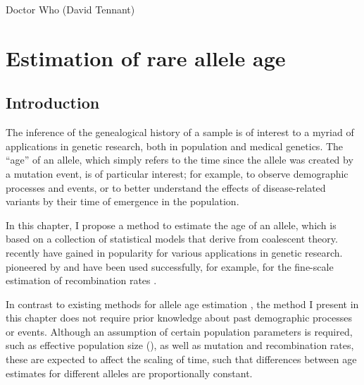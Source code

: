 
\glsresetall


{Doctor Who (David Tennant)}


{
\singlespacing
\chapter{Estimation of rare allele age}
\label{ch:rvage}
\minitoc
}


%
\section{Introduction}
%

The inference of the genealogical history of a sample is of interest to a myriad of applications in genetic research, both in population and medical genetics.
The ``age'' of an allele, which simply refers to the time since the allele was created by a mutation event, is of particular interest; for example, to observe demographic processes and events, or to better understand the effects of disease-related variants by their time of emergence in the population.

In this chapter, I propose a  method to estimate the age of an allele, which is based on a collection of statistical models that derive from coalescent theory.
 recently have gained in popularity for various applications in genetic research.
 pioneered by \citet{Hudson:2001vs} and have been used successfully, for example, for the fine-scale estimation of recombination rates \citep{McVean:2004ca,Myers:2005vi}.

In contrast to existing methods for allele age estimation \citep[\eg, see review by][]{Slatkin:2000us}, the method I present in this chapter does not require prior knowledge about past demographic processes or events.
Although an assumption of certain population parameters is required, such as effective population size (\Ne), as well as mutation and recombination rates, these are expected to affect the scaling of time, such that differences between age estimates for different alleles are proportionally constant.

